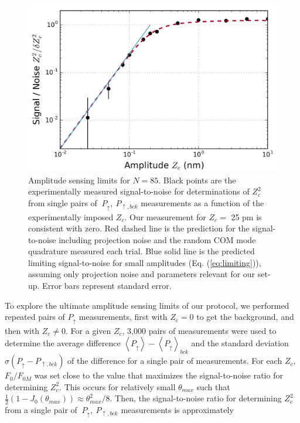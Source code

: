 \documentclass[aps,prl,twocolumn,superscriptaddress,floatfix]{revtex4-1}
\begin{document}
\begin{figure}
\includegraphics[width=\columnwidth]{sensing_limit}
\caption{Amplitude sensing limits for $N=85$. Black points are the experimentally measured signal-to-noise for determinations of $Z_{c}^{2}$ from single pairs of $\ P_{\uparrow},\: P_{\uparrow, bck}$ measurements as a function of the experimentally imposed $Z_c$. Our measurement for $Z_c =$ 25 pm is consistent with zero. Red dashed line is the prediction for the signal-to-noise including projection noise and the random COM mode quadrature measured each trial. Blue solid line is the predicted limiting signal-to-noise for small amplitudes (Eq. (\ref{eq:limiting})), assuming only projection noise and parameters relevant for our set-up. Error bars represent standard error.} \label{Fig_sens}
\end{figure}
To explore the ultimate amplitude sensing limits of our protocol, we performed repeated pairs of $P_{\uparrow}$ measurements, first with $Z_c = 0$ to get the background, and then with \mbox{$Z_{c}\neq0$}. For a given $Z_{c}$, 3,000 pairs of measurements were used to determine the average difference $\left\langle P_{\uparrow}\right\rangle -\left\langle P_{\uparrow}\right\rangle _{bck}$ and the standard deviation $\sigma\left( P_{\uparrow} - P_{\uparrow ,bck} \right)$ of the difference for a single pair of measurements. For each $Z_c$, $F_{0}/F_{0M}$ was set close to the value that maximizes the signal-to-noise ratio for determining $Z_{c}^{2}$. This occurs for relatively small $\theta_{max}$ such that \mbox{$\frac{1}{2}\left(1-J_{0}\left(\theta_{max}\right)\right)\approx\theta_{max}^{2}/8$}. Then, the signal-to-noise ratio for determining $Z_{c}^{2}$ from a single pair of $\ P_{\uparrow},\: P_{\uparrow, bck}$ measurements is approximately 
\end{document}
